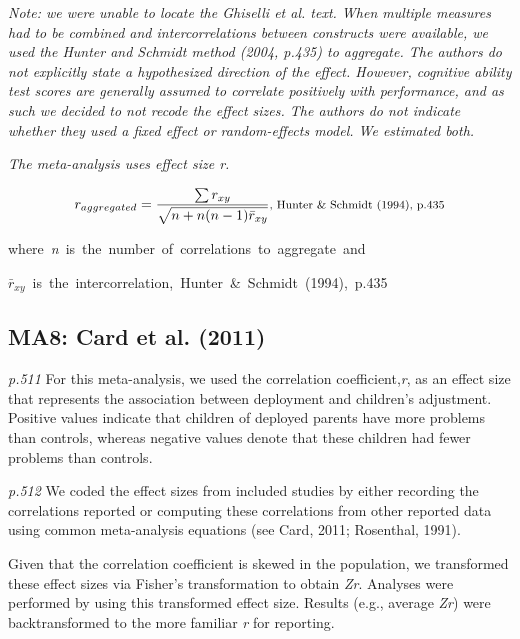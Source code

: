 \documentclass{article}
\begin{document}
\vspace{3 mm}
\textit{Note: we were unable to locate the Ghiselli et al. text. When multiple measures had to be combined and intercorrelations between constructs were available, we used the Hunter and Schmidt method (2004, p.435) to aggregate. The authors do not explicitly state a hypothesized direction of the effect. However, cognitive ability test scores are generally assumed to correlate positively with performance, and as such we decided to not recode the effect sizes. The authors do not indicate whether they used a fixed effect or random-effects model. We estimated both.  }

\vspace{3mm}
\textit{The meta-analysis uses effect size r.}

\begin{equation*}
r_{aggregated}=\frac{\sum r_{xy}}{\sqrt{n+n(n-1)\bar{r}_{xy}}} \mbox {\footnotesize, Hunter \& Schmidt (1994), p.435}
\end{equation*}

\mbox{\footnotesize where \textit{n} is the number of correlations to aggregate and }

\mbox{\footnotesize $\bar{r}_{xy}$ is the intercorrelation, Hunter \& Schmidt (1994), p.435 }


\subsection*{MA8: Card et al. (2011)}

\textit{p.511} For this meta-analysis, we used the correlation coefficient,\textit{r}, as an effect size that represents the association between deployment and children’s adjustment. Positive values indicate that children of deployed parents have more problems than controls, whereas negative values denote that these children had fewer problems than controls.

\textit{p.512} We coded the effect sizes from included studies by either recording the correlations reported or computing these correlations from other reported data using common meta-analysis equations (see Card, 2011; Rosenthal, 1991).

Given that the correlation coefficient is skewed in the population, we transformed these effect sizes via Fisher’s transformation to obtain \textit{Zr}. Analyses were performed by using this transformed effect size. Results (e.g., average \textit{Zr}) were backtransformed to the more familiar \textit{r} for reporting.
\end{document}
